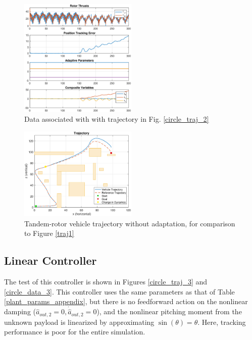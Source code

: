 \documentclass[letterpaper, 10 pt, conference]{ieeeconf}\usepackage[margin=1in]{geometry}
\begin{document}
\begin{figure}[h!]
	\centering
	\includegraphics[width=0.5\textwidth]{circle_noadap}
	\caption{Data associated with with trajectory in Fig. \ref{circle_traj_2}}
	\label{circle_data_2}
\end{figure}

\begin{figure}
	\centering
	\includegraphics[width=0.5\textwidth]{traj_noadap}
	\caption{Tandem-rotor vehicle trajectory without adaptation, for comparison to Figure \ref{traj1}}
	\label{traj_noadap}
\end{figure}


\subsection{Linear Controller}
The test of this controller is shown in Figures \ref{circle_traj_3} and \ref{circle_data_3}. This controller uses the same parameters as that of Table \ref{plant_params_appendix}, but there is no feedforward action on the nonlinear damping ($\hat{a}_{out,2} = 0, \dot{\hat{a}}_{out,2} = 0$), and the nonlinear pitching moment from the unknown payload is linearized by approximating $\sin(\theta) = \theta$. Here, tracking performance is poor for the entire simulation.
\end{document}
